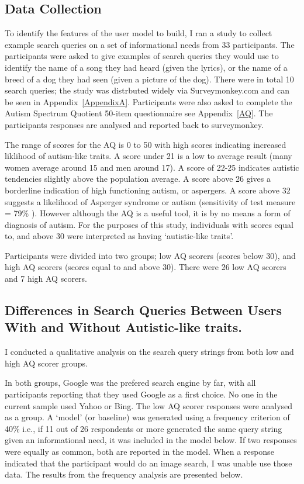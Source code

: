 \documentclass[a4paper, 11pt]{article}
\begin{document}
\subsection{Data Collection}
To identify the features of the user model to build, I ran a study to collect example search queries on a set of informational needs from 33 participants. The participants were asked to give examples of search queries they would use to identify the name of a song they had heard (given the lyrics), or the name of a breed of a dog they had seen (given a picture of the dog). There were in total 10 search queries; the study was distrbuted widely via Surveymonkey.com \cite{surveymonkey} and can be seen in Appendix~\ref{AppendixA}. Participants were also asked to complete the Autism Spectrum Quotient 50-item questionnaire see Appendix~\ref{AQ}. The participants responses are analysed and reported back to surveymonkey.

The range of scores for the AQ is 0 to 50 with high scores indicating increased liklihood of autism-like traits. A score under 21 is a low to average result (many women average around 15 and men around 17). A score of 22-25 indicates autistic tendencies slightly above the population average. A score above 26 gives a borderline indication of high functioning autism, or aspergers. A score above 32 suggests a likelihood of Asperger syndrome or autism (sensitivity of test measure = 79\% \cite{Baron Cohen et al}). However although the AQ is a useful tool, it is by no means a form of diagnosis of autism. For the purposes of this study, individuals with scores equal to, and above 30 were interpreted as having `autistic-like traits'.

Participants were divided into two groups; low AQ scorers (scores below 30), and high AQ scorers (scores equal to and above 30). There were 26 low AQ scorers and 7 high AQ scorers. 


\subsection{Differences in Search Queries Between Users With and Without Autistic-like traits.}
I conducted a qualitative analysis on the search query strings from both low and high AQ scorer groups.

In both groups, Google was the prefered search engine by far, with all participants reporting that they used Google as a first choice. No one in the current sample used Yahoo or Bing. 
The low AQ scorer responses were analysed as a group. A `model' (or baseline) was generated using a frequency criterion of 40\% i.e., if 11 out of 26 respondents or more generated the same query string given an informational need, it was included in the model below. If two responses were equally as common, both are reported in the model. When a response indicated that the participant would do an image search, I was unable use those data. The results from the frequency analysis are presented below.
\end{document}
